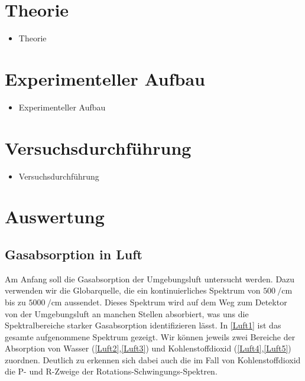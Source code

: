 \documentclass[paper=a4,fontsize=10pt,DIV=18,twocolumn,parskip=half]{scrartcl}
\numberwithin{equation}{section}    %
\begin{document}

\section{Theorie}
\begin{itemize}
\item Theorie
\end{itemize}


\section{Experimenteller Aufbau}
\begin{itemize}
\item Experimenteller Aufbau
\end{itemize}


\section{Versuchsdurchführung}
\begin{itemize}
\item Versuchsdurchführung
\end{itemize}


\section{Auswertung}

\subsection{Gasabsorption in Luft}
Am Anfang soll die Gasabsorption der Umgebungsluft untersucht werden. 
Dazu verwenden wir die Globarquelle, die ein kontinuierliches Spektrum von $\SI{500}{\per\centi\meter}$ bis zu $\SI{5000}{\per\centi\meter}$ aussendet. 
Dieses Spektrum wird auf dem Weg zum Detektor von der Umgebungsluft an manchen Stellen absorbiert, was uns die Spektralbereiche starker Gasabsorption identifizieren lässt.
In \ref{Luft1} ist das gesamte aufgenommene Spektrum gezeigt. 
Wir können jeweils zwei Bereiche der Absorption von Wasser (\ref{Luft2},\ref{Luft3}) und Kohlenstoffdioxid (\ref{Luft4},\ref{Luft5}) zuordnen. 
Deutlich zu erkennen sich dabei auch die im Fall von Kohlenstoffdioxid die P- und R-Zweige der Rotations-Schwingungs-Spektren.
\end{document}
